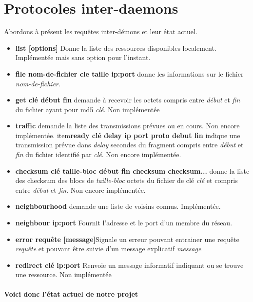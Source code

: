 	\section{Protocoles inter-daemons}
		Abordons à présent les requêtes inter-démons et leur état actuel.

\begin{itemize}
\item{\textbf{list [options]}} Donne la liste des ressources disponibles localement. Implémentée mais sans option pour l'instant.
\item{\textbf{file nom-de-fichier cle taille ip:port}} donne les informations sur le fichier \textit{nom-de-fichier}.
\item{\textbf{get clé début fin}} demande à recevoir les octets compris entre \textit{début} et \textit{fin} du 
fichier ayant pour md5 \textit{clé}. Non implémentée
\item{\textbf{traffic}} demande la liste des transmissions prévues ou en cours. Non encore implémentée.
item{\textbf{ready clé delay ip port proto debut fin}} indique une transmission prévue dans \textit{delay} secondes 
du fragment compris entre \textit{début} et \textit{fin} du fichier identifié par \textit{clé}. Non encore implémentée.
\item{\textbf{checksum clé taille-bloc début fin checksum checksum...}} donne la liste des checksum des blocs de
 \textit{taille-bloc} octets du fichier de clé \textit{clé} et compris entre \textit{début} et \textit{fin}. Non encore implémentée.
\item{\textbf{neighbourhood}} demande une liste de voisins connus. Implémentée.
\item{\textbf{neighbour ip:port}} Fournit l'adresse et le port d'un membre du réseau.
\item{\textbf{error requête [message]}}Signale un erreur pouvant entrainer une requête \textit{requête} et
 pouvant être suivie d'un message explicatif \textit{message}
\item{\textbf{redirect clé ip:port}} Renvoie un message informatif indiquant ou se trouve une ressource. Non implémentée
\end{itemize}

	\paragraph*{Voici donc l'état actuel de notre projet}
